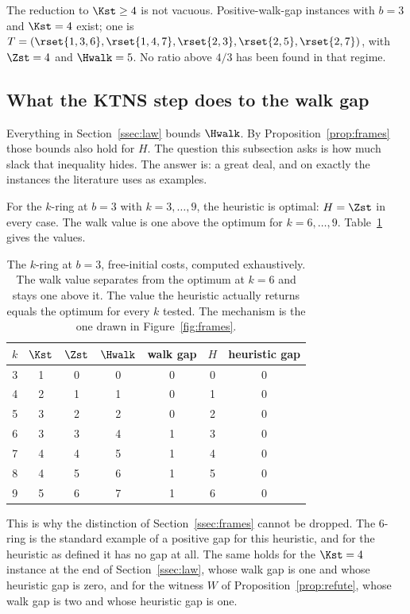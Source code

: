The reduction to $\Kst\ge4$ is not vacuous. Positive-walk-gap instances with $b=3$
and $\Kst=4$ exist; one is
$T=(\rset{1,3,6},\rset{1,4,7},\rset{2,3},\rset{2,5},\rset{2,7})$, with $\Zst=4$ and
$\Hwalk=5$. No ratio above $4/3$ has been found in that regime.

\subsection{What the KTNS step does to the walk gap}\label{ssec:ktnsgap}

Everything in Section~\ref{ssec:law} bounds $\Hwalk$. By
Proposition~\ref{prop:frames} those bounds also hold for $H$. The question this
subsection asks is how much slack that inequality hides. The answer is: a great deal,
and on exactly the instances the literature uses as examples.

\begin{observation}\label{obs:rings}
For the $k$-ring at $b=3$ with $k=3,\dots,9$, the heuristic is optimal:
$H=\Zst$ in every case. The walk value is one above the optimum for
$k=6,\dots,9$. Table~\ref{tab:rings} gives the values.
\end{observation}

\begin{table}[h]\centering
\begin{tabular}{ccccccc}
\toprule
$k$ & $\Kst$ & $\Zst$ & $\Hwalk$ & walk gap & $H$ & heuristic gap\\
\midrule
3 & 1 & 0 & 0 & 0 & 0 & 0\\
4 & 2 & 1 & 1 & 0 & 1 & 0\\
5 & 3 & 2 & 2 & 0 & 2 & 0\\
6 & 3 & 3 & 4 & 1 & 3 & 0\\
7 & 4 & 4 & 5 & 1 & 4 & 0\\
8 & 4 & 5 & 6 & 1 & 5 & 0\\
9 & 5 & 6 & 7 & 1 & 6 & 0\\
\bottomrule
\end{tabular}
\caption{The $k$-ring at $b=3$, free-initial costs, computed exhaustively. The walk
value separates from the optimum at $k=6$ and stays one above it. The value the
heuristic actually returns equals the optimum for every $k$ tested. The mechanism is
the one drawn in Figure~\ref{fig:frames}.}\label{tab:rings}
\end{table}

This is why the distinction of Section~\ref{ssec:frames} cannot be dropped. The
$6$-ring is the standard example of a positive gap for this heuristic, and for the
heuristic as defined it has no gap at all. The same holds for the $\Kst=4$ instance
at the end of Section~\ref{ssec:law}, whose walk gap is one and whose heuristic gap
is zero, and for the witness $W$ of Proposition~\ref{prop:refute}, whose walk gap is
two and whose heuristic gap is one.


